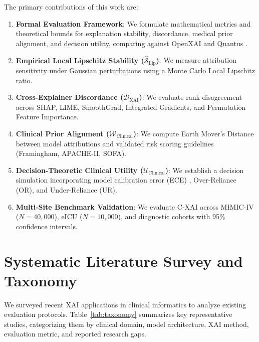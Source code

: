 \documentclass[3p,times,procedia]{elsarticle}
\theoremstyle{definition}
\begin{document}
The primary contributions of this work are:
\begin{enumerate}\setlength{\itemsep}{0pt}\setlength{\parsep}{0pt}\setlength{\parskip}{0pt}
    \item \textbf{Formal Evaluation Framework}: We formulate mathematical metrics and theoretical bounds for explanation stability, discordance, medical prior alignment, and decision utility, comparing against OpenXAI \cite{agarwal2022openxai} and Quantus \cite{hedstrom2023quantus}.
    \item \textbf{Empirical Local Lipschitz Stability ($\widehat{\mathcal{S}}_{\text{Lip}}$)}: We measure attribution sensitivity under Gaussian perturbations using a Monte Carlo Local Lipschitz ratio.
    \item \textbf{Cross-Explainer Discordance ($\mathcal{D}_{\text{XAI}}$)}: We evaluate rank disagreement across SHAP, LIME, SmoothGrad, Integrated Gradients, and Permutation Feature Importance.
    \item \textbf{Clinical Prior Alignment ($\mathcal{W}_{\text{Clinical}}$)}: We compute Earth Mover's Distance between model attributions and validated risk scoring guidelines (Framingham, APACHE-II, SOFA).
    \item \textbf{Decision-Theoretic Clinical Utility ($\mathcal{U}_{\text{Clinical}}$)}: We establish a decision simulation incorporating model calibration error (ECE) \cite{yeh2019fidelity}, Over-Reliance (OR), and Under-Reliance (UR).
    \item \textbf{Multi-Site Benchmark Validation}: We evaluate C-XAI across MIMIC-IV ($N=40,000$), eICU ($N=10,000$), and diagnostic cohorts with 95\% confidence intervals.
\end{enumerate}

\section{Systematic Literature Survey and Taxonomy}
We surveyed recent XAI applications in clinical informatics to analyze existing evaluation protocols. Table~\ref{tab:taxonomy} summarizes key representative studies, categorizing them by clinical domain, model architecture, XAI method, evaluation metric, and reported research gaps.
\end{document}

